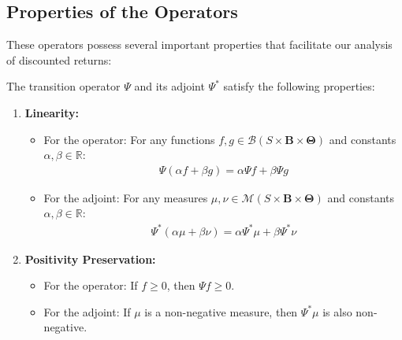 \subsection{Properties of the Operators}

These operators possess several important properties that facilitate our
analysis of discounted returns:

\begin{lemma}
    The transition operator $\Psi$ and its adjoint $\Psi^{*}$ satisfy the following
    properties:

    \begin{enumerate}
        \item \textbf{Linearity:}
              \begin{itemize}
                  \item For the operator: For any functions
                        $f, g \in \mathcal{B}(S \times \boldsymbol{B}\times \boldsymbol{\Theta}
                            )$
                        and constants $\alpha, \beta \in \mathbb{R}$:
                        \begin{align}
                            \Psi(\alpha f + \beta g) = \alpha \Psi f + \beta \Psi g
                        \end{align}

                  \item For the adjoint: For any measures
                        $\mu, \nu \in \mathcal{M}(S \times \boldsymbol{B}\times \boldsymbol{\Theta}
                            )$
                        and constants $\alpha, \beta \in \mathbb{R}$:
                        \begin{align}
                            \Psi^{*}(\alpha\mu + \beta\nu) = \alpha\Psi^{*}\mu + \beta\Psi^{*}\nu
                        \end{align}
              \end{itemize}

        \item \textbf{Positivity Preservation:}
              \begin{itemize}
                  \item For the operator: If $f \geq 0$, then $\Psi f \geq 0$.

                  \item For the adjoint: If $\mu$ is a non-negative measure, then $\Psi^{*}
                            \mu$ is also non-negative.
              \end{itemize}


\end{enumerate}
\end{lemma}
